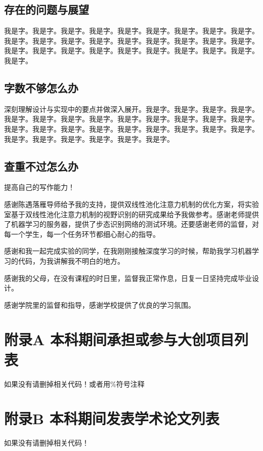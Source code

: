 \documentclass[supercite]{HustGraduPaper}
\theoremstyle{definition}
\begin{document}
\subsection{存在的问题与展望}

我是字。我是字。我是字。我是字。我是字。我是字。我是字。我是字。我是字。我是字。我是字。我是字。我是字。我是字。我是字。我是字。我是字。我是字。我是字。我是字。我是字。我是字。我是字。我是字。我是字。我是字。我是字。我是字。

\subsection{字数不够怎么办}

深刻理解设计与实现中的要点并做深入展开。我是字。我是字。我是字。我是字。我是字。我是字。我是字。我是字。我是字。我是字。我是字。我是字。我是字。我是字。我是字。我是字。我是字。我是字。我是字。我是字。我是字。我是字。我是字。我是字。我是字。我是字。我是字。我是字。

\subsection{查重不过怎么办}

提高自己的写作能力！

\newpage

\begin{thankpage}

感谢陈遇落雁导师给予我的支持，提供双线性池化注意力机制的优化方案，将实验室基于双线性池化注意力机制的视野识别的研究成果给予我做参考。感谢老师提供了机器学习的服务器，提供了步态识别网络的测试环境。还要感谢老师的监督，对每一个学生，每一个任务环节都细心耐心的指导。

感谢和我一起完成实验的同学，在我刚刚接触深度学习的时候，帮助我学习机器学习的代码，为我讲解我不明白的地方。

感谢我的父母，在没有课程的时日里，监督我正常作息，日复一日坚持完成毕业设计。

感谢学院里的监督和指导，感谢学校提供了优良的学习氛围。


\end{thankpage}

\nocite{*} %




\setcounter{secnumdepth}{0}
\appendix

\section{附录A 本科期间承担或参与大创项目列表}

如果没有请删掉相关代码！或者用\%符号注释

\newpage
\section{附录B 本科期间发表学术论文列表}

如果没有请删掉相关代码！
\end{document}
